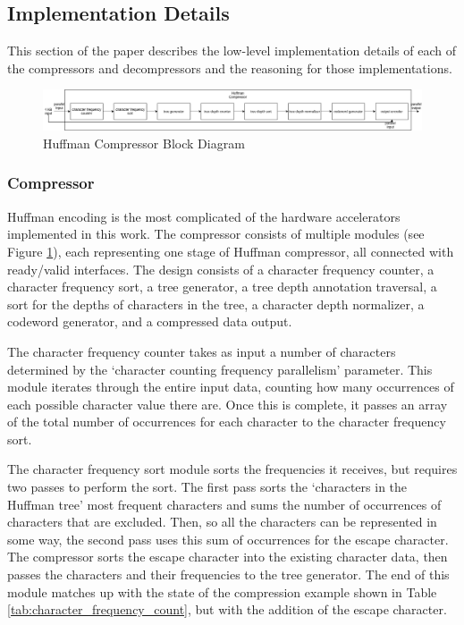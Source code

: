 \documentclass[doublespace,nopageskip]{VTthesis}
\begin{document}
\subsection{Implementation Details}\label{se:huffman_implementation_details}
This section of the paper describes the low-level implementation details of each of the compressors and decompressors and the reasoning for those implementations.

\begin{figure}[htb]
	\centering
	\includegraphics[scale=0.33]{Huffman Compressor Block Diagram.png}
	\caption{Huffman Compressor Block Diagram}
	\label{fig:huffman_compressor_block_diagram}
\end{figure}

\subsubsection{Compressor}\label{sss:huffman_compressor_implementation}
Huffman encoding is the most complicated of the hardware accelerators implemented in this work. The compressor consists of multiple modules (see Figure \ref{fig:huffman_compressor_block_diagram}), each representing one stage of Huffman compressor, all connected with ready/valid interfaces. The design consists of a character frequency counter, a character frequency sort, a tree generator, a tree depth annotation traversal, a sort for the depths of characters in the tree, a character depth normalizer, a codeword generator, and a compressed data output.

The character frequency counter takes as input a number of characters determined by the `character counting frequency parallelism' parameter. This module iterates through the entire input data, counting how many occurrences of each possible character value there are. Once this is complete, it passes an array of the total number of occurrences for each character to the character frequency sort.

The character frequency sort module sorts the frequencies it receives, but requires two passes to perform the sort. The first pass sorts the `characters in the Huffman tree' most frequent characters and sums the number of occurrences of characters that are excluded. Then, so all the characters can be represented in some way, the second pass uses this sum of occurrences for the escape character. The compressor sorts the escape character into the existing character data, then passes the characters and their frequencies to the tree generator. The end of this module matches up with the state of the compression example shown in Table \ref{tab:character_frequency_count}, but with the addition of the escape character. 
\end{document}

